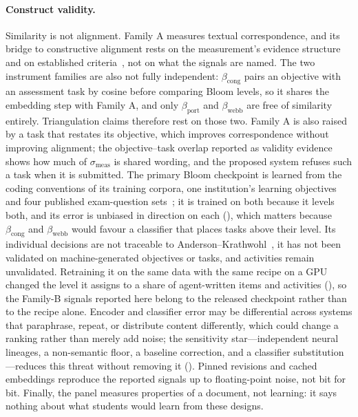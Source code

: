 \paragraph{Construct validity.}
Similarity is not alignment. Family A measures textual correspondence, and its bridge
to constructive alignment rests on the measurement's evidence structure and on
established criteria~\cite{biggs2011teaching,porter2002measuring,webb1997criteria},
not on what the signals are named. The two instrument families are also not fully
independent: $\beta_{\mathrm{cong}}$ pairs an objective with an assessment task by
cosine before comparing Bloom levels, so it shares the embedding step with Family A,
and only $\beta_{\mathrm{port}}$ and $\beta_{\mathrm{webb}}$ are free of similarity
entirely. Triangulation claims therefore rest on those two. Family A is also
raised by a task that restates its objective, which improves correspondence without
improving alignment; the objective--task overlap reported as validity evidence shows
how much of $\sigma_{\mathrm{meas}}$ is shared wording, and the proposed system refuses
such a task when it is submitted. The primary Bloom
checkpoint is learned from the coding conventions of its training corpora, one
institution's learning objectives~\cite{li2022bloomclassification} and four published
exam-question sets~\cite{faraji2026crossdataset}; it is trained on both because it levels
both, and its error is unbiased in direction on each (\TBD), which matters because
$\beta_{\mathrm{cong}}$ and $\beta_{\mathrm{webb}}$ would favour a classifier that places
tasks above their level. Its individual decisions are not
traceable to Anderson--Krathwohl~\cite{anderson2001taxonomy}, it has not been validated
on machine-generated objectives or tasks, and activities remain unvalidated. Retraining
it on the same data with the same recipe on a GPU changed the level it assigns to a
share of agent-written items and activities (\TBD), so the Family-B signals reported
here belong to the released checkpoint rather than to the recipe alone. Encoder and classifier error may be
differential across systems that paraphrase, repeat, or distribute content
differently, which could change a ranking rather than merely add noise; the
sensitivity star---independent neural lineages, a non-semantic floor, a
baseline correction, and a classifier substitution---reduces this threat without
removing it
(). Pinned revisions and cached embeddings reproduce the
reported signals up to floating-point noise, not bit for bit. Finally, the panel
measures properties of a document, not learning: it says nothing about what students
would learn from these designs.

